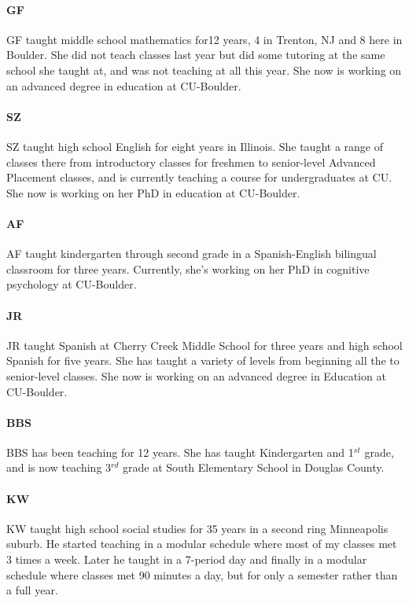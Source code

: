 \paragraph{GF} GF taught middle school mathematics for12 years, 4 in Trenton, NJ
and 8 here in Boulder.  She did not teach classes last year but did some
tutoring at the same school she taught at, and was not teaching at all this
year. She now is working on an advanced degree in education at CU-Boulder.

\paragraph{SZ} SZ taught high school English for eight years in Illinois.  She
taught a range of classes there from introductory classes for freshmen to
senior-level Advanced Placement classes, and is currently teaching a course for
undergraduates at CU.  She now is working on her PhD in education at CU-Boulder.

\paragraph{AF} AF taught kindergarten through second grade in a Spanish-English
bilingual classroom for three years.  Currently, she's working on her PhD in
cognitive psychology at CU-Boulder.

\paragraph{JR} JR taught Spanish at Cherry Creek Middle School for three years
and high school Spanish for five years. She has taught a variety of levels from
beginning all the to senior-level classes. She now is working on an advanced
degree in Education at CU-Boulder.

\paragraph{BBS} BBS has been teaching for 12 years. She has taught Kindergarten
and 1$^{st}$ grade, and is now teaching 3$^{rd}$ grade at South Elementary
School in Douglas County.

\paragraph{KW} KW taught high school social studies for 35 years in a second
ring Minneapolis suburb. He started teaching in a modular schedule where most of
my classes met 3 times a week. Later he taught in a 7-period day and finally in
a modular schedule where classes met 90 minutes a day, but for only a semester
rather than a full year.

